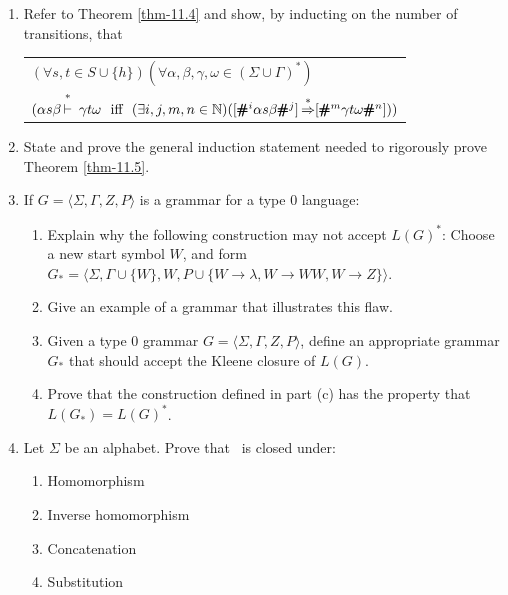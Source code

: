 \begin{enumerate}[{11.}1.]
\item Refer to Theorem \ref{thm-11.4} and show, by inducting on the number of transitions,
that
\begin{center}\begin{tabular}{l}
$(\forall s,t\in S\cup\{h\})(\forall\alpha,\beta,\gamma,\omega\in(\Sigma\cup
\Gamma)^*)$ \\
$(\alpha s\beta\Dvdash\gamma t\omega\text{\ \ iff\ \ }(\exists i,j,m,n\in\NN)
([\pmb{\#}^i\alpha s\beta\pmb{\#}^j]\DRightarrow[\pmb{\#}^m\gamma t\omega
\pmb{\#}^n]))$
\end{tabular}\end{center}

\item State and prove the general induction statement needed to rigorously
prove Theorem \ref{thm-11.5}.

\item If $G=\langle\Sigma,\Gamma,Z,P\rangle$ is a grammar for a type 0 language:
\begin{enumerate}
\item Explain why the following construction may not accept $L(G)^*$: Choose a
new start symbol $W$, and form $G_{\pmb{*}}=\langle\Sigma,\Gamma\cup\{W\},W,
P\cup\{W\rightarrow\lambda,W\rightarrow WW,W\rightarrow Z\}\rangle$.
\item Give an example of a grammar that illustrates this flaw.
\item Given a type 0 grammar $G=\langle\Sigma,\Gamma,Z,P\rangle$, define an
appropriate grammar $G_{\pmb{*}}$ that should accept the Kleene closure of
$L(G)$.
\item Prove that the construction defined in part (c) has the property that
$L(G_{\pmb{*}})=L(G)^*$.
\end{enumerate}

\item Let $\Sigma$ be an alphabet. Prove that \TSIG\ is closed under:
\begin{enumerate}
\item Homomorphism
\item Inverse homomorphism
\item Concatenation
\item Substitution
\end{enumerate}


\end{enumerate}

